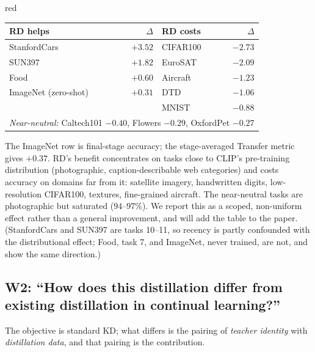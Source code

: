 \documentclass[11pt]{article}
\begin{document}
\begin{color}{red}
\begin{table}[h]\centering\small
\begin{tabular}{lr@{\qquad}lr}
\hline
\textbf{RD helps} & $\Delta$ & \textbf{RD costs} & $\Delta$ \\
\hline
StanfordCars & $+3.52$ & CIFAR100 & $-2.73$ \\
SUN397       & $+1.82$ & EuroSAT  & $-2.09$ \\
Food         & $+0.60$ & Aircraft & $-1.23$ \\
ImageNet (zero-shot) & $+0.31$ & DTD & $-1.06$ \\
             &         & MNIST    & $-0.88$ \\
\hline
\multicolumn{4}{l}{\textit{Near-neutral:} Caltech101 $-0.40$, Flowers $-0.29$, OxfordPet $-0.27$} \\
\hline
\end{tabular}
\end{table}

\noindent The ImageNet row is final-stage accuracy; the stage-averaged Transfer metric gives $+0.37$. RD's benefit concentrates on tasks close to CLIP's pre-training distribution (photographic, caption-describable web categories) and costs accuracy on domains far from it: satellite imagery, handwritten digits, low-resolution CIFAR100, textures, fine-grained aircraft. The near-neutral tasks are photographic but saturated ($94$--$97\%$). We report this as a scoped, non-uniform effect rather than a general improvement, and will add the table to the paper. (StanfordCars and SUN397 are tasks 10--11, so recency is partly confounded with the distributional effect; Food, task 7, and ImageNet, never trained, are not, and show the same direction.)

\subsection*{W2: ``How does this distillation differ from existing distillation in continual learning?''}

The objective is standard KD; what differs is the pairing of \emph{teacher identity} with \emph{distillation data}, and that pairing is the contribution.


\end{color}
\end{document}
